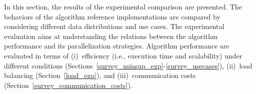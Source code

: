 
In this section, the results of the experimental comparison are presented.
The behaviors of the algorithm reference implementations are compared
by considering different data distributions and use cases. 
The experimental evaluation aims at understanding the relations between 
the algorithm performance 
and its parallelization strategies. 
Algorithm performance are evaluated in terms of
(i)~efficiency (i.e., execution time and scalability) under different conditions
(Sections~\ref{survey_minsup_exp}-\ref{survey_usecases}),
(ii)~load balancing (Section~\ref{load_exp}), and
(iii)~communication costs (Section~\ref{survey_communication_costs}).


